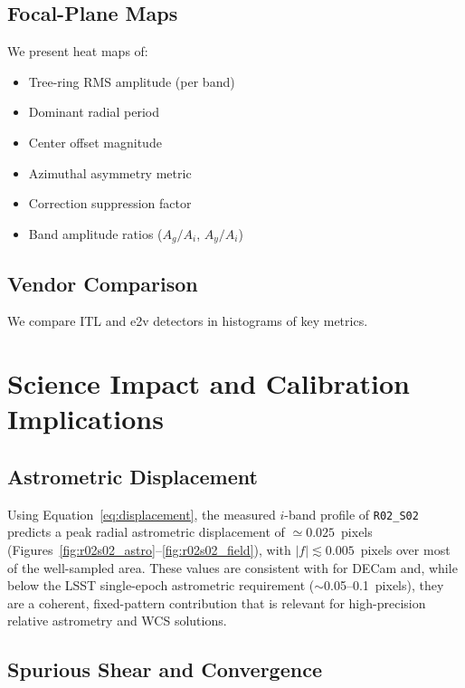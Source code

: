 \subsection{Focal-Plane Maps}

We present heat maps of:

\begin{itemize}
\item Tree-ring RMS amplitude (per band)
\item Dominant radial period
\item Center offset magnitude
\item Azimuthal asymmetry metric
\item Correction suppression factor
\item Band amplitude ratios ($A_g / A_i$, $A_y / A_i$)
\end{itemize}

\subsection{Vendor Comparison}

We compare ITL and e2v detectors in histograms of key metrics.


\section{Science Impact and Calibration Implications} \label{sec:science}

\subsection{Astrometric Displacement}

Using Equation~\ref{eq:displacement}, the measured $i$-band profile of \texttt{R02\_S02}
predicts a peak radial astrometric displacement of $\simeq0.025$~pixels
(Figures~\ref{fig:r02s02_astro}--\ref{fig:r02s02_field}), with $|f|\lesssim0.005$~pixels over
most of the well-sampled area. These values are consistent with \citet{Plazas2014} for DECam
and, while below the LSST single-epoch astrometric requirement ($\sim$0.05--0.1~pixels), they
are a coherent, fixed-pattern contribution that is relevant for high-precision relative
astrometry and WCS solutions.

\subsection{Spurious Shear and Convergence}

